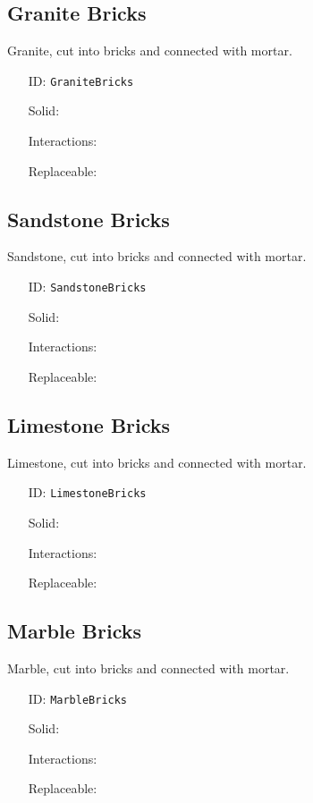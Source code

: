 \subsection{Granite Bricks}\label{subsec:blocks_granite bricks}
Granite, cut into bricks and connected with mortar.
\newline
\begin{itemize}[nosep]
\item[ID:] \texttt{GraniteBricks}
\item[Solid:]  \Checkmark \item[Interactions:]  \XSolidBrush \item[Replaceable:]  \XSolidBrush \end{itemize}

\subsection{Sandstone Bricks}\label{subsec:blocks_sandstone bricks}
Sandstone, cut into bricks and connected with mortar.
\newline
\begin{itemize}[nosep]
\item[ID:] \texttt{SandstoneBricks}
\item[Solid:]  \Checkmark \item[Interactions:]  \XSolidBrush \item[Replaceable:]  \XSolidBrush \end{itemize}

\subsection{Limestone Bricks}\label{subsec:blocks_limestone bricks}
Limestone, cut into bricks and connected with mortar.
\newline
\begin{itemize}[nosep]
\item[ID:] \texttt{LimestoneBricks}
\item[Solid:]  \Checkmark \item[Interactions:]  \XSolidBrush \item[Replaceable:]  \XSolidBrush \end{itemize}

\subsection{Marble Bricks}\label{subsec:blocks_marble bricks}
Marble, cut into bricks and connected with mortar.
\newline
\begin{itemize}[nosep]
\item[ID:] \texttt{MarbleBricks}
\item[Solid:]  \Checkmark \item[Interactions:]  \XSolidBrush \item[Replaceable:]  \XSolidBrush \end{itemize}


